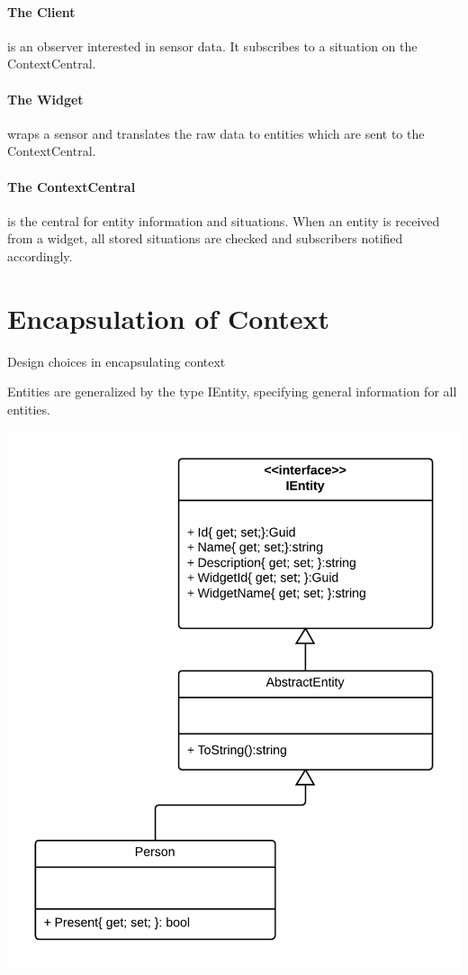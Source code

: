 \documentclass[]{report}
\begin{document}
\paragraph{The Client} is an observer interested in sensor data. It subscribes to a situation on the ContextCentral.

\paragraph{The Widget} wraps a sensor and translates the raw data to entities which are sent to the ContextCentral.

\paragraph{The ContextCentral} is the central for entity information and situations. When an entity is received from a widget, all stored situations are checked and subscribers notified accordingly.



\section{Encapsulation of Context}
Design choices in encapsulating context

Entities are generalized by the type IEntity, specifying general information for all entities.


\begin{center}
\includegraphics[scale=0.15]{ContextClassDiagram.png}
\end{center}
\end{document}
